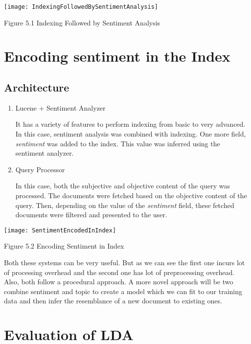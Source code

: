 \texttt{[image: IndexingFollowedBySentimentAnalysis]}
\begin{center}
 Figure 5.1 Indexing Followed by Sentiment Analysis
\end{center}

\section{Encoding sentiment in the Index}

\subsection{Architecture}

\begin{enumerate}
 \item Lucene + Sentiment Analyzer
  \par It has a variety of features to perform indexing from basic to very advanced. In this case, sentiment analysis was combined with
  indexing. One more field, \textit{sentiment} was added to the index. This value was inferred using the sentiment analyzer. 
 \item Query Processor
  \par In this case, both the subjective and objective content of the query was processed. The documents were fetched based on the objective
  content of the query. Then, depending on the value of the \textit{sentiment} field, these fetched documents were filtered and presented
  to the user.
\end{enumerate}

\texttt{[image: SentimentEncodedInIndex]}
\begin{center}
 Figure 5.2 Encoding Sentiment in Index
\end{center}

Both these systems can be very useful. But as we can see the first one incurs lot of processing overhead and the second one has lot of 
preprocessing overhead. Also, both follow a procedural approach. A more novel approach will be two combine sentiment and topic to create 
a model which we can fit to our training data and then infer the resemblance of a new document to existing ones.

\section{Evaluation of LDA}


